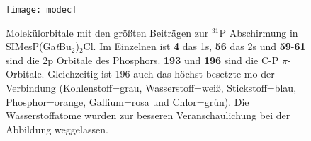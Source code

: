 \begin{figure}[ht!]
	\centering
	\texttt{[image: modec]}
	\captionsetup{figurewithin = chapter}
	\captionsetup{font=small, labelfont=bf}\caption[{Molekülorbitale von SIMesP(Ga\textit{t}Bu$_2$)$_2$Cl}]{Molekülorbitale mit den größten Beiträgen zur $^{31}$P Abschirmung in \mbox{SIMesP(Ga\textit{t}Bu$_2$)$_2$Cl}. Im Einzelnen ist \textbf{\textsf{4}} das 1s, \textbf{\textsf{56}} das 2s und \textbf{\textsf{59}}-\textbf{\textsf{61}} sind die 2p Orbitale des Phosphors. \textbf{\textsf{193}} und \textbf{\textsf{196}} sind die C-P $\pi$-Orbitale. Gleichzeitig ist 196 auch das höchst besetzte \ac{mo} der Verbindung (Kohlenstoff=grau, Wasserstoff=weiß, Stickstoff=blau, Phosphor=orange, Gallium=rosa und Chlor=grün). Die Wasserstoffatome wurden zur besseren Veranschaulichung bei der Abbildung weggelassen.}
\label{abb:modec}
\end{figure}

